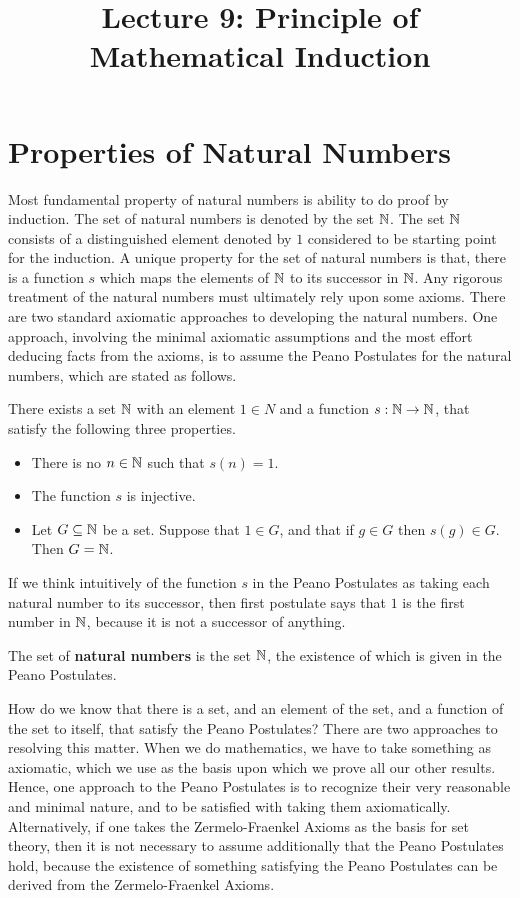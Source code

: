 \documentclass[a4paper,english,12pt]{article}
\title{Lecture 9: Principle of Mathematical Induction}
\author{}
\begin{document}
\maketitle
\section{Properties of Natural Numbers}
Most fundamental property of natural numbers is ability to do proof by induction. 
The set of natural numbers is denoted by the set $\mathbb{N}$. The set $\mathbb{N}$ consists of a distinguished element denoted by $1$ considered to be starting point for the induction. A unique property for the set of natural numbers is that, there is a function $s$ which maps the elements of $\mathbb{N}$ to its successor in $\mathbb{N}$. Any rigorous treatment of the natural numbers must ultimately rely upon some axioms. There are two standard axiomatic approaches to developing the natural numbers. One approach, involving the minimal axiomatic assumptions and the most effort deducing facts from the axioms, is to assume the Peano Postulates for the natural numbers, which are stated as follows.

\begin{axiom} There exists a set $\mathbb{N}$ with an element $1\in N$ and a function $s:\mathbb{N}\to \mathbb{N}$, that satisfy the following three properties.
\begin{itemize}
	\item There is no $n \in \mathbb{N}$ such that $s(n)=1$.
	\item The function $s$ is injective.
	\item Let $G \subseteq \mathbb{N}$ be a set. Suppose that $1 \in G$, and that if $g \in G$ then $s(g) \in G$. Then $G=\mathbb{N}$.
\end{itemize}
\end{axiom}

If we think intuitively of the function $s$ in the Peano Postulates as taking each natural number to its successor, then first postulate says that $1$ is the first number in $\mathbb{N}$, because it is not a successor of anything.

\begin{defn} The set of {\bf natural numbers} is the set $\mathbb{N}$, the existence of which is given in the Peano Postulates.
\end{defn}

How do we know that there is a set, and an element of the set, and a function of the set to itself, that satisfy the Peano Postulates? There are two approaches to resolving this matter. When we do mathematics, we have to take something as axiomatic, which we use as the basis upon which we prove all our other results. Hence, one approach to the Peano Postulates is to recognize their very reasonable and minimal nature, and to be satisfied with taking them axiomatically. Alternatively, if one takes the Zermelo-Fraenkel Axioms as the basis for set theory, then it is not necessary to assume additionally that the Peano Postulates hold, because the existence of something satisfying the Peano Postulates can be derived from the Zermelo-Fraenkel Axioms.
\end{document}
